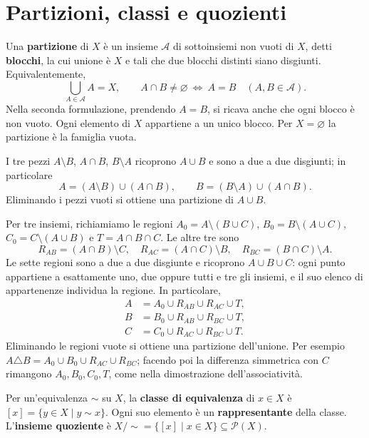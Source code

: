 \section{Partizioni, classi e quozienti}
\begin{definizione}
Una \textbf{partizione} di $X$ è un insieme $\mathcal A$ di sottoinsiemi non vuoti di $X$, detti \textbf{blocchi}, la cui unione è $X$ e tali che due blocchi distinti siano disgiunti. Equivalentemente,
\[
\bigcup_{A\in\mathcal A}A=X,\qquad
A\cap B\ne\varnothing\ \Longleftrightarrow\ A=B
\quad(A,B\in\mathcal A).
\]
Nella seconda formulazione, prendendo $A=B$, si ricava anche che ogni blocco è non vuoto. Ogni elemento di $X$ appartiene a un unico blocco. Per $X=\varnothing$ la partizione è la famiglia vuota.
\end{definizione}

\begin{esempio}
I tre pezzi $A\setminus B$, $A\cap B$, $B\setminus A$ ricoprono $A\cup B$ e sono a due a due disgiunti; in particolare
\[
A=(A\setminus B)\cup(A\cap B),\qquad
B=(B\setminus A)\cup(A\cap B).
\]
Eliminando i pezzi vuoti si ottiene una partizione di $A\cup B$.

Per tre insiemi, richiamiamo le regioni $A_0=A\setminus(B\cup C)$, $B_0=B\setminus(A\cup C)$, $C_0=C\setminus(A\cup B)$ e $T=A\cap B\cap C$. Le altre tre sono
\[
R_{AB}=(A\cap B)\setminus C,\quad
R_{AC}=(A\cap C)\setminus B,\quad
R_{BC}=(B\cap C)\setminus A.
\]
Le sette regioni sono a due a due disgiunte e ricoprono $A\cup B\cup C$: ogni punto appartiene a esattamente uno, due oppure tutti e tre gli insiemi, e il suo elenco di appartenenze individua la regione. In particolare,
\[
\begin{aligned}
A&=A_0\cup R_{AB}\cup R_{AC}\cup T,\\
B&=B_0\cup R_{AB}\cup R_{BC}\cup T,\\
C&=C_0\cup R_{AC}\cup R_{BC}\cup T.
\end{aligned}
\]
Eliminando le regioni vuote si ottiene una partizione dell'unione. Per esempio $A\triangle B=A_0\cup B_0\cup R_{AC}\cup R_{BC}$; facendo poi la differenza simmetrica con $C$ rimangono $A_0,B_0,C_0,T$, come nella dimostrazione dell'associatività.
\end{esempio}

\begin{definizione}
Per un'equivalenza $\sim$ su $X$, la \textbf{classe di equivalenza} di $x\in X$ è $[x]=\{y\in X\mid y\sim x\}$. Ogni suo elemento è un \textbf{rappresentante} della classe. L'\textbf{insieme quoziente} è $X/{\sim}=\{[x]\mid x\in X\}\subseteq\mathcal P(X)$.
\end{definizione}

